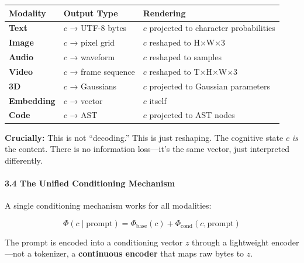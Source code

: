 \documentclass[
  11pt,
  a4paper,
]{article}
\begin{document}
\begin{longtable}[]{@{}
  >{\raggedright\arraybackslash}p{}
  >{\raggedright\arraybackslash}p{}
  >{\raggedright\arraybackslash}p{}@{}}
\toprule\noalign{}
\begin{minipage}[b]{\linewidth}\raggedright
Modality
\end{minipage} & \begin{minipage}[b]{\linewidth}\raggedright
Output Type
\end{minipage} & \begin{minipage}[b]{\linewidth}\raggedright
Rendering
\end{minipage} \\
\midrule\noalign{}
\endhead
\bottomrule\noalign{}
\endlastfoot
\textbf{Text} & \(c\) → UTF-8 bytes & \(c\) projected to character
probabilities \\
\textbf{Image} & \(c\) → pixel grid & \(c\) reshaped to H×W×3 \\
\textbf{Audio} & \(c\) → waveform & \(c\) reshaped to samples \\
\textbf{Video} & \(c\) → frame sequence & \(c\) reshaped to T×H×W×3 \\
\textbf{3D} & \(c\) → Gaussians & \(c\) projected to Gaussian
parameters \\
\textbf{Embedding} & \(c\) → vector & \(c\) itself \\
\textbf{Code} & \(c\) → AST & \(c\) projected to AST nodes \\
\end{longtable}

\textbf{Crucially:} This is not ``decoding.'' This is just reshaping.
The cognitive state \(c\) \emph{is} the content. There is no information
loss---it's the same vector, just interpreted differently.

\paragraph{3.4 The Unified Conditioning
Mechanism}\label{the-unified-conditioning-mechanism}

A single conditioning mechanism works for all modalities:

\[
\Phi(c \mid \text{prompt}) = \Phi_{\text{base}}(c) + \Phi_{\text{cond}}(c, \text{prompt})
\]

The prompt is encoded into a conditioning vector \(z\) through a
lightweight encoder---not a tokenizer, a \textbf{continuous encoder}
that maps raw bytes to \(z\).
\end{document}
